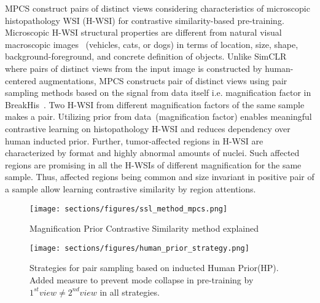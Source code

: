\documentclass[conference]{IEEEtran}
\begin{document}
MPCS construct pairs of distinct views considering characteristics of microscopic histopathology WSI (H-WSI) for contrastive similarity-based pre-training.
Microscopic H-WSI structural properties are different from natural visual macroscopic images~\cite{deng2009imagenet} (vehicles, cats, or dogs) in terms of location, size, shape, background-foreground, and concrete definition of objects.
Unlike SimCLR~\cite{chen2020simple} where pairs of distinct views from the input image is constructed by human-centered augmentations, MPCS constructs pair of distinct views using pair sampling methods based on the signal from data itself i.e. magnification factor in BreakHis~\cite{spanhol2016dataset}. 
Two H-WSI from different magnification factors of the same sample makes a pair. 
Utilizing prior from data~(magnification factor) enables meaningful contrastive learning on histopathology H-WSI and reduces dependency over human inducted prior.
Further, tumor-affected regions in H-WSI are characterized by format and highly abnormal amounts of nuclei. 
Such affected regions are promising in all the H-WSIs of different magnification for the same sample.
Thus, affected regions being common and size invariant in positive pair of a sample allow learning contrastive similarity by region attentions.



\begin{figure}[t]
    \centering
    \texttt{[image: sections/figures/ssl\_method\_mpcs.png]}
    \vspace{-0.2cm}
    \caption{Magnification Prior Contrastive Similarity method explained}
    \label{fig:ssl_mpcs}
    \vspace{-4mm}
\end{figure}
\begin{figure}[!ht]
    \centering
    \texttt{[image: sections/figures/human\_prior\_strategy.png]}
    \vspace{-0.2cm}
    \caption{Strategies for pair sampling based on inducted Human Prior(HP). Added measure to prevent mode collapse in pre-training by $1^{st} view \neq 2^{nd} view$ in all strategies.}
    \label{fig:human_prior}
    \vspace{-5mm}
\end{figure}
\end{document}
